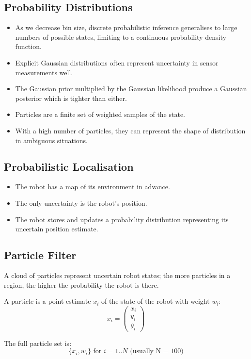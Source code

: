 \documentclass[11pt]{article}
\begin{document}
\subsection{Probability Distributions}
\begin{itemize}
  \item As we decrease bin size, discrete probabilistic inference generalises to large numbers of possible states, limiting to a continuous probability density function.
  \item Explicit Gaussian distributions often represent uncertainty in sensor measurements well.
  \item The Gaussian prior multiplied by the Gaussian likelihood produce a Gaussian posterior which is tighter than either.
  \item Particles are a finite set of weighted samples of the state.
  \item With a high number of particles, they can represent the shape of distribution in ambiguous situations.
\end{itemize}

\subsection{Probabilistic Localisation}
\begin{itemize}
  \item The robot has a map of its environment in advance.
  \item The only uncertainty is the robot's position.
  \item The robot stores and updates a probability distribution representing its uncertain position estimate.
\end{itemize}

\subsection{Particle Filter}
A cloud of particles represent uncertain robot states; the more particles in a region, the higher the probability the robot is there.

A particle is a point estimate $x_i$ of the state of the robot with weight $w_i$:
\[
  x_i = 
  \begin{pmatrix}
    x_i \\
    y_i \\
    \theta_i
  \end{pmatrix}
\]

The full particle set is:
\[
  \{ x_i, w_i \} \text{ for } i = 1..N \text{ (usually N = 100)}
\]
\end{document}

